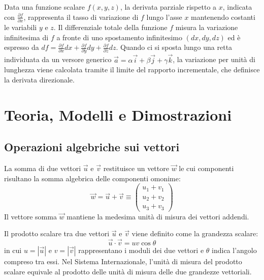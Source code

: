 \documentclass[12pt, a4paper]{article}
\begin{document}
\begin{tcolorbox}[title={BOX 2: Richiamo di Analisi, Derivate Parziali, Differenziale Totale e Limiti Direzionali}]
Data una funzione scalare $f(x,y,z)$, la derivata parziale rispetto a $x$, indicata con $\frac{\partial f}{\partial x}$, rappresenta il tasso di variazione di $f$ lungo l'asse $x$ mantenendo costanti le variabili $y$ e $z$. Il differenziale totale della funzione $f$ misura la variazione infinitesima di $f$ a fronte di uno spostamento infinitesimo $(dx, dy, dz)$ ed è espresso da $df = \frac{\partial f}{\partial x}dx + \frac{\partial f}{\partial y}dy + \frac{\partial f}{\partial z}dz$. Quando ci si sposta lungo una retta individuata da un versore generico $\vec{a} = \alpha \vec{i} + \beta \vec{j} + \gamma \vec{k}$, la variazione per unità di lunghezza viene calcolata tramite il limite del rapporto incrementale, che definisce la derivata direzionale.
\end{tcolorbox}

\section{Teoria, Modelli e Dimostrazioni}

\subsection{Operazioni algebriche sui vettori}

La somma di due vettori $\vec{u}$ e $\vec{v}$ restituisce un vettore $\vec{w}$ le cui componenti risultano la somma algebrica delle componenti omonime:
\[
\vec{w} = \vec{u} + \vec{v} \equiv \begin{pmatrix} u_1 + v_1 \\ u_2 + v_2 \\ u_3 + v_3 \end{pmatrix}
\]
Il vettore somma $\vec{w}$ mantiene la medesima unità di misura dei vettori addendi.

Il prodotto scalare tra due vettori $\vec{u}$ e $\vec{v}$ viene definito come la grandezza scalare:
\[
\vec{u} \cdot \vec{v} = u v \cos\theta
\]
in cui $u = |\vec{u}|$ e $v = |\vec{v}|$ rappresentano i moduli dei due vettori e $\theta$ indica l'angolo compreso tra essi. Nel Sistema Internazionale, l'unità di misura del prodotto scalare equivale al prodotto delle unità di misura delle due grandezze vettoriali.
\end{document}
